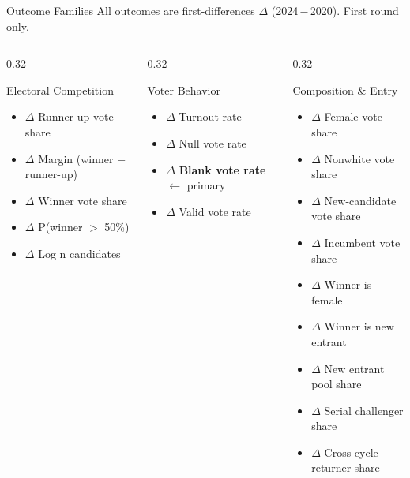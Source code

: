 \documentclass[aspectratio=169,10pt]{beamer}
\begin{document}
\begin{frame}{Outcome Families}
All outcomes are first-differences $\Delta$ (2024\,$-$\,2020). First round only.
\medskip
\begin{columns}[T]
\begin{column}{0.32\textwidth}
\begin{block}{Electoral Competition}
  \footnotesize
  \begin{itemize}\itemsep2pt
    \item $\Delta$ Runner-up vote share
    \item $\Delta$ Margin (winner $-$ runner-up)
    \item $\Delta$ Winner vote share
    \item $\Delta$ P(winner $>$ 50\%)
    \item $\Delta$ Log n candidates
  \end{itemize}
\end{block}
\end{column}
\begin{column}{0.32\textwidth}
\begin{block}{Voter Behavior}
  \footnotesize
  \begin{itemize}\itemsep2pt
    \item $\Delta$ Turnout rate
    \item $\Delta$ Null vote rate
    \item $\Delta$ \textbf{Blank vote rate} $\leftarrow$ primary
    \item $\Delta$ Valid vote rate
  \end{itemize}
\end{block}
\end{column}
\begin{column}{0.32\textwidth}
\begin{block}{Composition \& Entry}
  \footnotesize
  \begin{itemize}\itemsep2pt
    \item $\Delta$ Female vote share
    \item $\Delta$ Nonwhite vote share
    \item $\Delta$ New-candidate vote share
    \item $\Delta$ Incumbent vote share
    \item $\Delta$ Winner is female
    \item $\Delta$ Winner is new entrant
    \item $\Delta$ New entrant pool share
    \item $\Delta$ Serial challenger share
    \item $\Delta$ Cross-cycle returner share
  \end{itemize}
\end{block}
\end{column}
\end{columns}
\end{frame}
\end{document}
